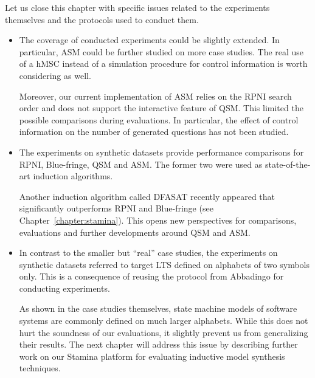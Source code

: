 Let us close this chapter with specific issues related to the experiments themselves and the protocols used to conduct them. 
\begin{itemize}

\item The coverage of conducted experiments could be slightly extended. In particular, ASM could be further studied on more case studies. The real use of a hMSC instead of a simulation procedure for control information is worth considering as well.

Moreover, our current implementation of ASM relies on the RPNI search order and does not support the interactive feature of QSM. This limited the possible comparisons during evaluations. In particular, the effect of control information on the number of generated questions has not been studied.

\item The experiments on synthetic datasets provide performance comparisons for RPNI, Blue-fringe, QSM and ASM. The former two were used as state-of-the-art induction algorithms. 

Another induction algorithm called DFASAT recently appeared that significantly outperforms RPNI and Blue-fringe \cite{Heule:2010} (see Chapter~\ref{chapter:stamina}). This opens new perspectives for comparisons, evaluations and further developments around QSM and ASM. 

\item In contrast to the smaller but ``real'' case studies, the experiments on synthetic datasets referred to target LTS defined on alphabets of two symbols only. This is a consequence of reusing the protocol from Abbadingo for conducting experiments. 

As shown in the case studies themselves, state machine models of software systems are commonly defined on much larger alphabets. While this does not hurt the soundness of our evaluations, it slightly prevent us from generalizing their results. The next chapter will address this issue by describing further work on our Stamina platform for evaluating inductive model synthesis techniques.
\end{itemize}
